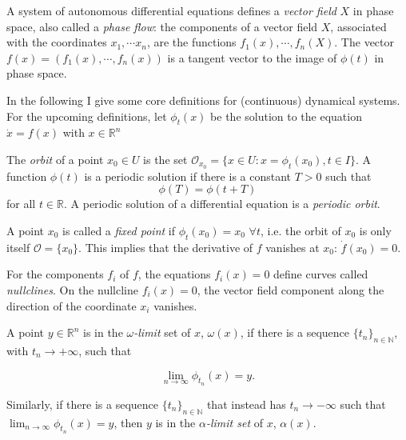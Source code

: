 A system of autonomous differential equations defines a \textit{vector field} $X$ in phase space, also called a \textit{phase flow}: the components of a vector field $X$,
associated with the coordinates $x_1, \cdots x_n$, are the functions $f_1(x), \cdots, f_n(X)$. The vector $f(x)=(f_1(x), \cdots, f_n(x))$ is a tangent vector to the 
image of $\phi(t)$ in phase space.

In the following I give some core definitions for (continuous) dynamical systems. For the upcoming definitions, let $\phi_t(x)$ be the solution to the equation $\dot{x}=f(x)$
with $x\in\mathbb{R}^n$

\begin{definition}[Orbits]
    The \textit{orbit} of a point $x_0 \in U$ is the set $\mathscr{O}_{x_0} = \{x \in U : x = \phi_t(x_0), t \in I \}$.  
    A function $\phi(t)$ is a periodic solution if there is a constant $T>0$ such that 
\begin{equation}
    \phi(T) = \phi(t+T)
    \label{eq:periodic}
\end{equation}
for all $t \in \mathbb{R}$. A periodic solution of a differential equation is a \textit{periodic orbit}.
\end{definition}

\begin{definition}
    A point $x_0$ is called a \textit{fixed point} if 
    $\phi_t(x_0)=x_0$ $\forall t$, i.e. the orbit of $x_0$ is only itself $\mathscr{O} = \{x_0\}$. This implies that the derivative of $f$ vanishes at $x_0$: $\dot{f}(x_0) = 0$.
\end{definition}

\begin{definition}[Nullclines]
    For the components $f_i$ of $f$, the equations $f_i(x) = 0$ define curves called \textit{nullclines}. On the nullcline $f_i(x)=0$, 
    the vector field component along the direction of the coordinate $x_i$ vanishes.
\end{definition}

\begin{definition} A point $y\in\mathbb{R}^n$ is in the \textit{$\omega$-limit} set of $x$, $\omega(x)$,
    if there is a sequence $\{t_n\}_{n\in\mathbb{N}}$, with $t_n\rightarrow +\infty$, such that

    \begin{equation}
        \lim_{n\rightarrow\infty}\phi_{t_n}(x) = y.
    \end{equation}

    Similarly, if there is a sequence $\{t_n\}_{n\in\mathbb{N}}$ that instead has $t_n\rightarrow -\infty$ such that $\lim_{n\rightarrow\infty}\phi_{t_n}(x) = y$,
    then  $y$ is in the \textit{$\alpha$-limit set} of $x$, $\alpha(x)$.
\end{definition}

